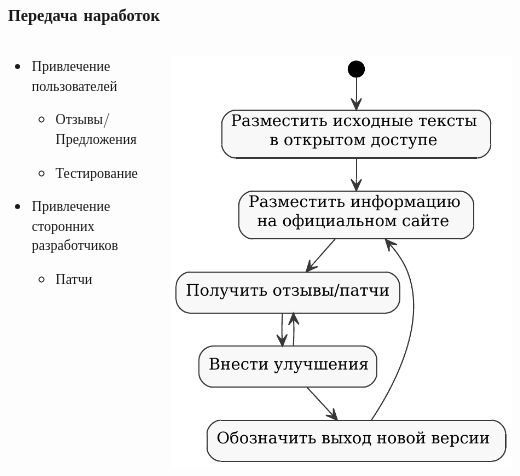 \documentclass[unicode]{beamer}
\begin{document}
\begin{frame}
\transwipe[direction=90]
\frametitle{Передача наработок}
\begin{columns}
\begin{column}{0.6\textwidth}
\begin{block}{}
\begin{itemize} 
  \item Привлечение пользователей
  \begin{itemize}
  	\item Отзывы/Предложения
  	\item Тестирование
  \end{itemize}
  \item Привлечение сторонних разработчиков	
  \begin{itemize}
  \item Патчи
  \end{itemize}  
\end{itemize}
\end{block}
\end{column}
\begin{column}{0.4\textwidth}
\centerline{\includegraphics[width=1\textwidth]{opensource-feedback.pdf}}
\end{column}
\end{columns}
\end{frame}
\end{document}
